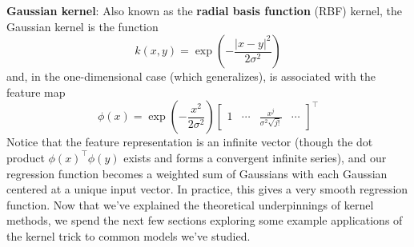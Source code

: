 \textbf{Gaussian kernel}: Also known as the \textbf{radial basis function} (RBF) kernel, the Gaussian kernel is the function
$$ k(x, y) = \exp \left( - \frac{| x - y |^2}{2 \sigma^2} \right) $$
\indent and, in the one-dimensional case (which generalizes), is associated with the feature map
$$ \phi(x) = \exp \left( - \frac{x^2}{2 \sigma^2} \right) \begin{bmatrix} 1 & \cdots & \frac{x^j}{\sigma^2 \sqrt{j!}} & \cdots \end{bmatrix}^\intercal $$
\indent Notice that the feature representation is an infinite vector (though the dot product $ \phi(x)^\intercal \phi(y) $ exists and forms a convergent infinite series), and our regression function becomes a weighted sum of Gaussians with each Gaussian centered at a unique input vector. In practice, this gives a very smooth regression function.
\newline
Now that we've explained the theoretical underpinnings of kernel methods, we spend the next few sections exploring some example applications of the kernel trick to common models we've studied.

